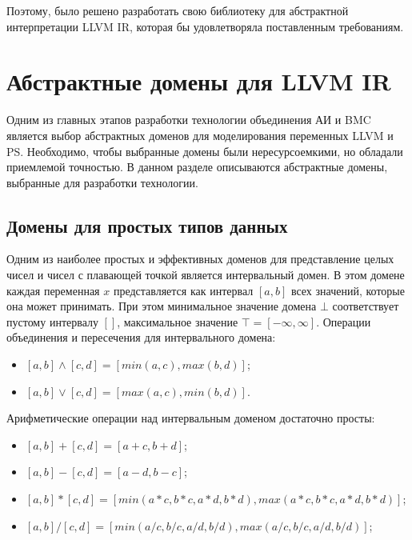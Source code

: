 Поэтому, было решено разработать свою библиотеку для абстрактной интерпретации
LLVM IR, которая бы удовлетворяла поставленным требованиям.

\section{Абстрактные домены для LLVM IR}
Одним из главных этапов разработки технологии объединения АИ и BMC является
выбор абстрактных доменов для моделирования переменных LLVM и PS. Необходимо,
чтобы выбранные домены были нересурсоемкими, но обладали приемлемой точностью.
В данном разделе описываются абстрактные домены, выбранные для разработки 
технологии.

\subsection{Домены для простых типов данных}
Одним из наиболее простых и эффективных доменов для представление целых чисел и
чисел с плавающей точкой является интервальный домен. В этом домене каждая 
переменная $x$ представляется как интервал $[a, b]$ всех значений, которые она 
может принимать. При этом минимальное значение домена $\bot$ соответствует 
пустому интервалу $[]$, максимальное значение $\top = [-\infty, \infty]$. 
Операции объединения и пересечения для интервального домена:
\begin{itemize}
\item $[a, b] \wedge [c, d] = [min(a, c), max(b, d)]$;
\item $[a, b] \vee [c, d] = [max(a, c), min(b, d)]$.
\end{itemize}

Арифметические операции над интервальным доменом достаточно просты:
\begin{itemize}
\item $[a, b] + [c, d] = [a + c, b + d]$;
\item $[a, b] - [c, d] = [a - d, b - c]$;
\item $[a, b] * [c, d] = [min(a * c, b * c, a * d, b * d), max(a * c, b * c,
a * d, b * d)]$;
\item $[a, b] / [c, d] = [min(a / c, b / c, a / d, b / d), max(a / c, b / c,
a / d, b / d)]$;
\end{itemize}

